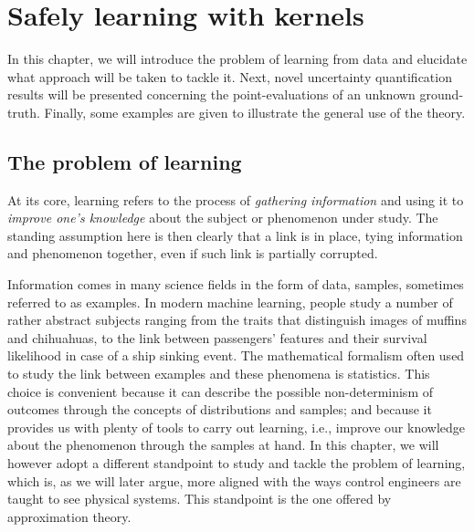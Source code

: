 \cleardoublepage
\chapter{Safely learning with kernels}

In this chapter, we will introduce the problem of learning from data and elucidate what approach will be taken to tackle it. Next, novel uncertainty quantification results will be presented concerning the point-evaluations of an  unknown ground-truth. Finally, some examples are given to illustrate the general use of the theory.

\section{The problem of learning}

At its core, learning refers to the process of \textit{gathering information} and using it to \textit{improve one's knowledge} about the subject or phenomenon under study. The standing assumption here is then clearly that a link is in place, tying information and phenomenon together, even if such link is partially corrupted.

Information comes in many science fields in the form of data, samples, sometimes referred to as examples. In modern machine learning, people study a number of rather abstract subjects ranging from the traits that distinguish images of muffins and chihuahuas, to the link between passengers' features and their survival likelihood in case of a ship sinking event.  The mathematical formalism often used to study the link between examples and these phenomena is statistics. This choice is convenient because it can describe the possible non-determinism of outcomes through the concepts of distributions and samples; and because it provides us with plenty of tools to carry out learning, i.e., improve our knowledge about the phenomenon through the samples at hand. In this chapter, we will however adopt a different standpoint to study and tackle the problem of learning, which is, as we will later argue, more aligned with the ways control engineers are taught to see physical systems. This standpoint is the one offered by approximation theory.



